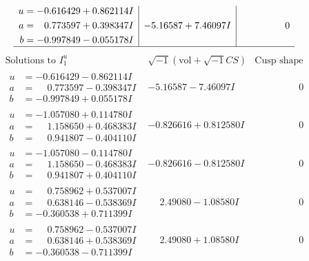 \documentclass[1p]{elsarticle_modified}
\theoremstyle{definition}
\newcommand{\I}{\sqrt{-1}}
\begin{document}
$$\begin{array}{c|c|c}
\begin{aligned}
u &= -0.616429 + 0.862114 I \\
a &= \phantom{-}0.773597 + 0.398347 I \\
b &= -0.997849 - 0.055178 I\end{aligned}
 & -5.16587 + 7.46097 I & \phantom{-0.000000 } 0\\
 \hline 
 \end{array}$$\newpage$$\begin{array}{c|c|c}  
\text{Solutions to }I^u_{1}& \I (\text{vol} + \sqrt{-1}CS) & \text{Cusp shape}\\
 \hline 
\begin{aligned}
u &= -0.616429 - 0.862114 I \\
a &= \phantom{-}0.773597 - 0.398347 I \\
b &= -0.997849 + 0.055178 I\end{aligned}
 & -5.16587 - 7.46097 I & \phantom{-0.000000 } 0 \\ \hline\begin{aligned}
u &= -1.057080 + 0.114780 I \\
a &= \phantom{-}1.158650 + 0.468383 I \\
b &= \phantom{-}0.941807 - 0.404110 I\end{aligned}
 & -0.826616 + 0.812580 I & \phantom{-0.000000 } 0 \\ \hline\begin{aligned}
u &= -1.057080 - 0.114780 I \\
a &= \phantom{-}1.158650 - 0.468383 I \\
b &= \phantom{-}0.941807 + 0.404110 I\end{aligned}
 & -0.826616 - 0.812580 I & \phantom{-0.000000 } 0 \\ \hline\begin{aligned}
u &= \phantom{-}0.758962 + 0.537007 I \\
a &= \phantom{-}0.638146 - 0.538369 I \\
b &= -0.360538 + 0.711399 I\end{aligned}
 & \phantom{-}2.49080 - 1.08580 I & \phantom{-0.000000 } 0 \\ \hline\begin{aligned}
u &= \phantom{-}0.758962 - 0.537007 I \\
a &= \phantom{-}0.638146 + 0.538369 I \\
b &= -0.360538 - 0.711399 I\end{aligned}
 & \phantom{-}2.49080 + 1.08580 I & \phantom{-0.000000 } 0 \\ \hline\begin{aligned}

\end{aligned}
\end{array}$$
\end{document}
